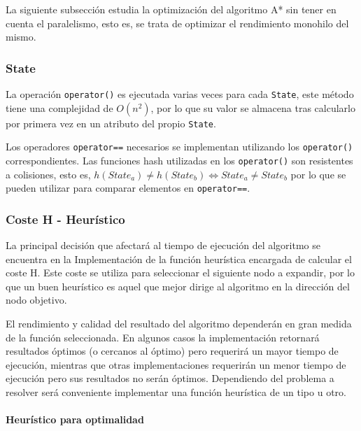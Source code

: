 La siguiente subsección estudia la optimización
del algoritmo A* sin tener en cuenta el paralelismo,
esto es, se trata de optimizar el rendimiento
monohilo del mismo.

\subsubsection{State}

La operación \lstinline{operator()} es ejecutada varias veces para cada
\lstinline{State}, este método tiene una complejidad de $O(n^2)$,
por lo que su valor se almacena tras calcularlo por primera vez
en un atributo del propio \lstinline{State}.

Los operadores \lstinline{operator==} necesarios se implementan utilizando
los \lstinline{operator()} correspondientes.
Las funciones hash utilizadas en los \lstinline{operator()}
son resistentes a colisiones,
esto es, $
h(State_a) \ne h(State_b) \iff State_a \ne State_b
$
por lo que se pueden
utilizar para comparar elementos en \lstinline{operator==}.

\pagebreak
\subsubsection{Coste H - Heurístico}
\label{ssec:Heuristicos}

La principal decisión que afectará al tiempo de ejecución
del algoritmo se encuentra en la Implementación
de la función heurística encargada de calcular el coste H.
Este coste se utiliza para seleccionar el siguiente nodo
a expandir, por lo que un buen heurístico es aquel que
mejor dirige al algoritmo en la dirección del nodo objetivo.

El rendimiento y calidad del resultado del algoritmo
dependerán en gran medida de la función seleccionada.
En algunos casos la implementación retornará resultados
óptimos (o cercanos al óptimo) pero requerirá un mayor tiempo
de ejecución, mientras que otras implementaciones
requerirán un menor tiempo de ejecución pero sus resultados
no serán óptimos.
Dependiendo del problema a resolver será conveniente implementar
una función heurística de un tipo u otro.

\paragraph{Heurístico para optimalidad}~

